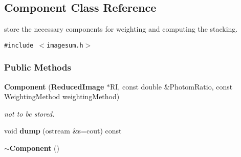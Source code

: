 \subsection{Component  Class Reference}
\label{class_component}
store the necessary components for weighting and computing the stacking. 


{\tt \#include $<$imagesum.h$>$}

\subsubsection*{Public Methods}
\begin{CompactItemize}
\item 
{}
{\bf Component} ({\bf Reduced\-Image} $\ast$RI, const double \&Photom\-Ratio, const Weighting\-Method weighting\-Method)\label{class_component_a0}

\begin{CompactList}\small\item\em not to be stored.\item\end{CompactList}\item 
{}
void {\bf dump} (ostream \&s=cout) const\label{class_component_a1}

\item 
{}
{\bf $\sim$Component} ()\label{class_component_a2}

\end{CompactItemize}
